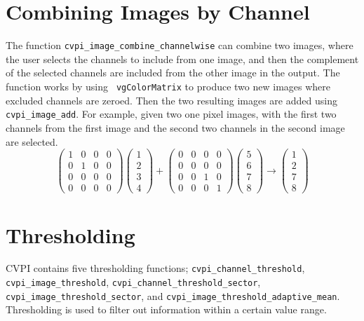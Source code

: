 \documentclass[12pt]{report}
\begin{document}
\section{Combining Images by Channel}
\label{sec-3-8}
The function {\tt cvpi\_image\_combine\_channelwise} can combine two
images, where the user selects the channels to include from one image,
and then the complement of the selected channels are included from the
other image in the output. The function works by using {\tt
  vgColorMatrix} to produce two new images where excluded channels are
zeroed. Then the two resulting images are added using {\tt
  cvpi\_image\_add}.
For example, given two one pixel images, with the first two
channels from the first image and the second two channels in the
second image are selected.
   \[
 \begin{pmatrix} 1 & 0 & 0 & 0 \\ 0 & 1 & 0 & 0 \\ 0 & 0 & 0 & 0 \\ 0 & 0 & 0 & 0 \end{pmatrix}
          \begin{pmatrix} 1 \\ 2 \\ 3 \\ 4 \end{pmatrix}
          + \begin{pmatrix} 0 & 0 & 0 &
 0 \\ 0 & 0 & 0 & 0 \\ 0 & 0 & 1 & 0 \\ 0 & 0 & 0 & 1 \end{pmatrix}
  \begin{pmatrix} 5 \\ 6 \\ 7 \\ 8 \end{pmatrix} \to \begin{pmatrix} 1 \\ 2 \\ 7 \\ 8 \end{pmatrix}
\]

\section{Thresholding}
\label{sec-3-9}
CVPI contains five thresholding functions;
{\tt cvpi\_channel\_threshold}, {\tt cvpi\_image\_threshold},
{\tt cvpi\_channel\_threshold\_sector}, {\tt cvpi\_image\_threshold\_sector}, and
{\tt cvpi\_image\_threshold\_adaptive\_mean}. Thresholding is used to
filter out information within a certain value range.
\end{document}

